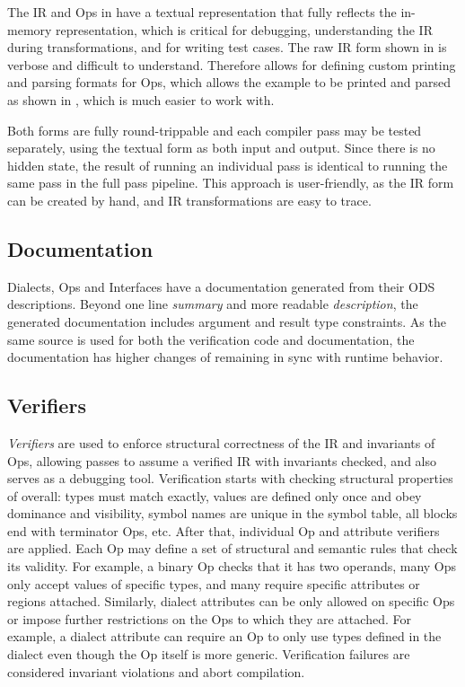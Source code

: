 The IR and Ops in \MLIR have a textual representation that fully reflects
the in-memory representation, which is critical for debugging, understanding
the IR during transformations, and for writing test cases.  The
raw IR form shown in  is verbose and difficult to understand.
Therefore \MLIR allows for defining custom printing and parsing formats for Ops,
which allows the example to be printed and parsed as shown in ,
which is much easier to work with.

Both forms are fully round-trippable and each compiler pass may be tested
separately, using the textual form as both input and output. Since there is
no hidden state, the
result of running an individual pass is identical to running the same pass in
the full pass pipeline. This approach is user-friendly, as the IR form can be
created by hand, and IR transformations are easy to trace.

\subsection{Documentation}
Dialects, Ops and Interfaces have a documentation generated from their ODS
descriptions. Beyond one line \emph{summary} and more readable
\emph{description}, the generated documentation includes argument and result
type constraints. As the same source is used for both the verification code and
documentation, the documentation has higher changes of remaining in sync with
runtime behavior.

\subsection{Verifiers}

\emph{Verifiers} are used to enforce structural correctness
of the IR and invariants of Ops, allowing passes to assume a verified IR with
invariants checked, and also serves as a debugging tool. Verification
starts with checking structural properties of \MLIR overall: types must match
exactly, values are defined only once and obey dominance and visibility, symbol
names are unique in the symbol table, all blocks end with
terminator Ops, etc. After that, individual Op and attribute verifiers are applied.
Each Op may define a set of structural and semantic rules that check its
validity. For example, a binary Op checks that it has two operands, many Ops
only accept values of specific types, and many require specific
attributes or regions attached. Similarly, dialect attributes can be only
allowed on specific Ops or impose further restrictions on the Ops to which they
are attached. For example, a dialect attribute can require an Op to only use
types defined in the dialect even though the Op itself is more generic.
Verification failures are considered invariant violations and abort compilation.
